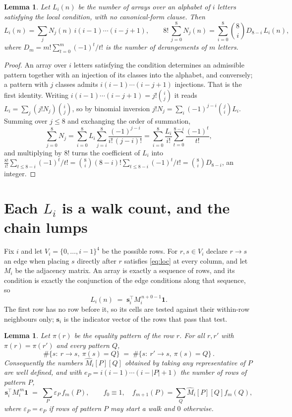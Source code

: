 \documentclass[11pt,a4paper]{article}
\theoremstyle{plain}
\newtheorem{lemma}[theorem]{Lemma}
\theoremstyle{definition}
\begin{document}
\begin{lemma}\label{lem:inv}
Let $L_i(n)$ be the number of arrays over an alphabet of $i$ letters satisfying the local
condition, with no canonical-form clause. Then
\[
L_i(n)=\sum_j N_j(n)\,i(i-1)\cdots(i-j+1),
\qquad
8!\,\sum_{j=0}^{8}N_j(n)=\sum_{i=0}^{8}\binom{8}{i}D_{8-i}\,L_i(n),
\]
where $D_m=m!\sum_{t=0}^{m}(-1)^t/t!$ is the number of derangements of $m$ letters.
\end{lemma}

\begin{proof}
An array over $i$ letters satisfying the condition determines an admissible pattern together
with an injection of its classes into the alphabet, and conversely; a pattern with $j$
classes admits $i(i-1)\cdots(i-j+1)$ injections. That is the first identity. Writing
$i(i-1)\cdots(i-j+1)=j!\binom{i}{j}$ it reads $L_i=\sum_j (j!N_j)\binom{i}{j}$, so by
binomial inversion $j!N_j=\sum_{i}(-1)^{j-i}\binom{j}{i}L_i$. Summing over
$j\le 8$ and exchanging the order of summation,
\[
\sum_{j=0}^{8}N_j=\sum_{i=0}^{8}L_i\sum_{j=i}^{8}\frac{(-1)^{j-i}}{i!\,(j-i)!}
=\sum_{i=0}^{8}\frac{L_i}{i!}\sum_{t=0}^{8-i}\frac{(-1)^t}{t!} ,
\]
and multiplying by $8!$ turns the coefficient of $L_i$ into
$\frac{8!}{i!}\sum_{t\le 8-i}(-1)^t/t!=\binom{8}{i}(8-i)!\sum_{t\le 8-i}(-1)^t/t!
=\binom{8}{i}D_{8-i}$, an integer.
\end{proof}

\section{Each $L_i$ is a walk count, and the chain lumps}

Fix $i$ and let $V_i=\{0,\dots,i-1\}^{4}$ be the possible rows. For $r,s\in V_i$
declare $r\to s$ an edge when placing $s$ directly after $r$ satisfies \eqref{eq:loc} at
every column, and let $M_i$ be the adjacency matrix. An array is exactly a sequence of
rows, and its condition is exactly the conjunction of the edge conditions along that
sequence, so
\[
L_i(n)\;=\;\mathbf{s}_i^{\!\top}M_i^{\,n+0-1}\mathbf{1} .
\]
The first row has no row before it, so its cells are tested
against their within-row neighbours only; $\mathbf{s}_i$ is the indicator vector of the
rows that pass that test.

\begin{lemma}\label{lem:lump}
Let $\pi(r)$ be the equality pattern of the row $r$. For all $r,r'$ with
$\pi(r)=\pi(r')$ and every pattern $Q$,
\[
\#\{s:\ r\to s,\ \pi(s)=Q\}\;=\;\#\{s:\ r'\to s,\ \pi(s)=Q\}\, .
\]
Consequently the numbers $\widehat M_i[P][Q]$ obtained by taking any representative of $P$
are well defined, and with $e_P=i(i-1)\cdots(i-|P|+1)$ the number of rows of pattern $P$,
\[
\mathbf{s}_i^{\!\top}M_i^{\,m}\mathbf{1}\;=\;\sum_P \varepsilon_P\,f_m(P),
\qquad f_0\equiv1,\quad f_{m+1}(P)=\sum_Q\widehat M_i[P][Q]f_m(Q),
\]
where $\varepsilon_P=e_P$ if rows of pattern $P$ may start a walk and $0$ otherwise.
\end{lemma}
\end{document}
